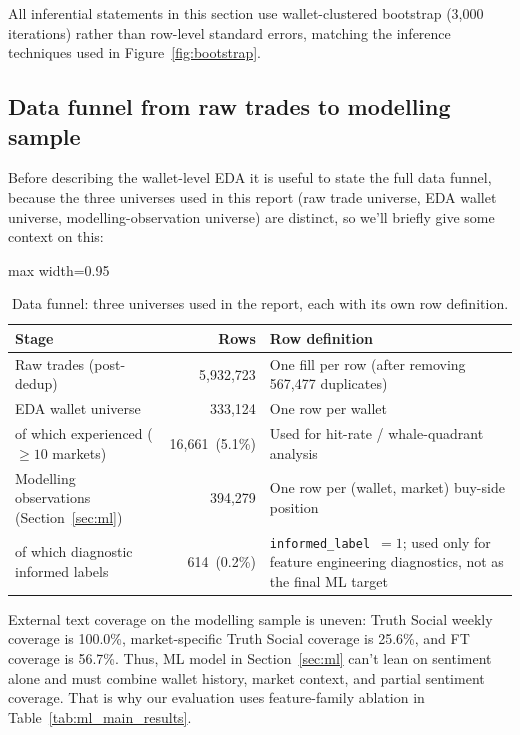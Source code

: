 \documentclass[11pt,a4paper]{article}
\newcommand{\edit}[1]{#1}
\newcommand{\RawUniqueWallets}{\edit{333{,}124}}
\newcommand{\ExpWallets}{\edit{16{,}661}}
\newcommand{\ExpWalletsPct}{\edit{5.1}}
\newcommand{\PositiveLabels}{\edit{614}}
\begin{document}
All inferential statements in this section use wallet-clustered bootstrap (3{,}000 iterations) rather than row-level standard errors, matching the inference techniques used in Figure~\ref{fig:bootstrap}.

\subsection{Data funnel from raw trades to modelling sample}
\label{sec:eda_funnel}

Before describing the wallet-level EDA it is useful to state the full data funnel, because the three universes used in this report (raw trade universe, EDA wallet universe, modelling-observation universe) are distinct, so we'll briefly give some context on this:

\begin{table}[H]
\centering
\small
\setlength{\tabcolsep}{8pt}
\begin{adjustbox}{max width=0.95\textwidth}
\begin{tabular}{lrl}
\toprule
Stage & Rows & Row definition \\
\midrule
Raw trades (post-dedup)                 & 5{,}932{,}723 & One fill per row (after removing 567{,}477 duplicates) \\
EDA wallet universe                     & \RawUniqueWallets & One row per wallet \\
\quad of which experienced ($\geq 10$ markets) & \ExpWallets\ (\ExpWalletsPct\%) & Used for hit-rate / whale-quadrant analysis \\
Modelling observations (Section~\ref{sec:ml}) & 394{,}279 & One row per (wallet, market) buy-side position \\
\quad of which diagnostic informed labels & \PositiveLabels\ (0.2\%) & \edit{\texttt{informed\_label}~$=1$; used only for feature engineering diagnostics, not as the final ML target} \\
\bottomrule
\end{tabular}
\end{adjustbox}
\caption{Data funnel: three universes used in the report, each with its own row definition.}
\label{tab:data_funnel}
\end{table}

External text coverage on the modelling sample is uneven: Truth Social weekly coverage is 100.0\%, market-specific Truth Social coverage is 25.6\%, and FT coverage is 56.7\%. Thus, ML model in Section~\ref{sec:ml} can't lean on sentiment alone and must combine wallet history, market context, and partial sentiment coverage. \edit{That} is why our evaluation uses feature-family ablation in Table~\ref{tab:ml_main_results}.
\end{document}
